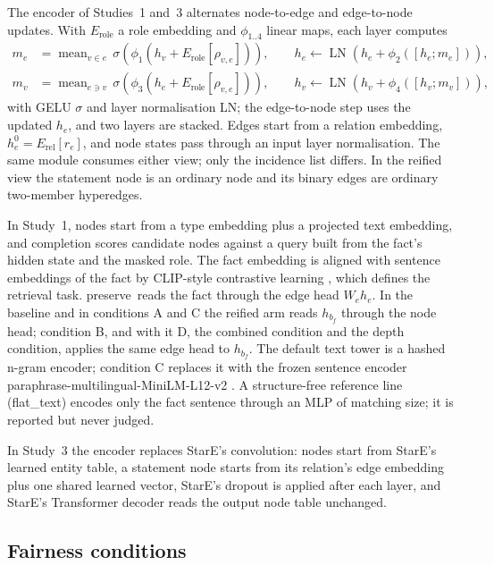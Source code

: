 \documentclass[11pt,a4paper]{article}
\newcommand{\hyper}{\textsf{preserve}}
\begin{document}
The encoder of Studies~1 and~3 alternates node-to-edge and edge-to-node updates. With $E_{\text{role}}$ a role embedding and $\phi_{1..4}$ linear maps, each layer computes
\begin{align}
m_e &= \operatorname{mean}_{v \in e}\, \sigma\!\left(\phi_1(h_v + E_{\text{role}}[\rho_{v,e}])\right), \qquad h_e \leftarrow \operatorname{LN}\!\left(h_e + \phi_2([h_e; m_e])\right),\\
m_v &= \operatorname{mean}_{e \ni v}\, \sigma\!\left(\phi_3(h_e + E_{\text{role}}[\rho_{v,e}])\right), \qquad h_v \leftarrow \operatorname{LN}\!\left(h_v + \phi_4([h_v; m_v])\right),
\end{align}
with GELU $\sigma$ and layer normalisation LN; the edge-to-node step uses the updated $h_e$, and two layers are stacked. Edges start from a relation embedding, $h_e^{0} = E_{\text{rel}}[r_e]$, and node states pass through an input layer normalisation. The same module consumes either view; only the incidence list differs. In the reified view the statement node is an ordinary node and its binary edges are ordinary two-member hyperedges.

In Study~1, nodes start from a type embedding plus a projected text embedding, and completion scores candidate nodes against a query built from the fact's hidden state and the masked role. The fact embedding is aligned with sentence embeddings of the fact by CLIP-style contrastive learning \citep{radford2021clip}, which defines the retrieval task. \hyper\ reads the fact through the edge head $W_e h_e$. In the baseline and in conditions A and C the reified arm reads $h_{b_f}$ through the node head; condition B, and with it D, the combined condition and the depth condition, applies the same edge head to $h_{b_f}$. The default text tower is a hashed n-gram encoder; condition C replaces it with the frozen sentence encoder paraphrase-multilingual-MiniLM-L12-v2 \citep{reimers2019sbert}. A structure-free reference line (\textsf{flat\_text}) encodes only the fact sentence through an MLP of matching size; it is reported but never judged.

In Study~3 the encoder replaces StarE's convolution: nodes start from StarE's learned entity table, a statement node starts from its relation's edge embedding plus one shared learned vector, StarE's dropout is applied after each layer, and StarE's Transformer decoder reads the output node table unchanged.

\subsection{Fairness conditions}
\end{document}
